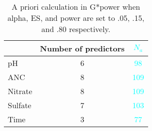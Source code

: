 \begin{table}
		\caption[A priori results]{A priori calculation in G*power when alpha, ES, and power are set to .05, .15, and .80 respectively.}
		\begin{center}
		\begin{tabular}{lcc}
		\toprule
		 & \multicolumn{1}{l}{Number of predictors} & \textcolor{cyan}{$N_a$} \\  \midrule
		pH & 6 & \textcolor{cyan}{98} \\ 
		ANC & 8 & \textcolor{cyan}{109} \\ 
		Nitrate & 8 & \textcolor{cyan}{109} \\ 
		Sulfate & 7 & \textcolor{cyan}{103} \\ 
		Time & 3 & \textcolor{cyan}{77} \\  \bottomrule
		\end{tabular}
		\end{center}
		\label{tab:APN}
		\end{table}